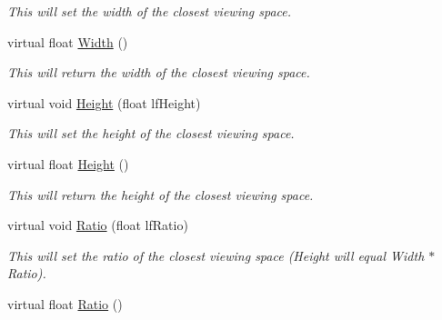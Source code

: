 \begin{DoxyCompactItemize}
\begin{DoxyCompactList}\small\item\em This will set the width of the closest viewing space. \end{DoxyCompactList}\item 
\hypertarget{classc_perspective_control_a9c22ac8a598cf9c6c732bb4fbb5bd333}{
virtual float \hyperlink{classc_perspective_control_a9c22ac8a598cf9c6c732bb4fbb5bd333}{Width} ()}
\label{classc_perspective_control_a9c22ac8a598cf9c6c732bb4fbb5bd333}

\begin{DoxyCompactList}\small\item\em This will return the width of the closest viewing space. \end{DoxyCompactList}\item 
\hypertarget{classc_perspective_control_a83d8c55d372776fad7c3f50e491fed0c}{
virtual void \hyperlink{classc_perspective_control_a83d8c55d372776fad7c3f50e491fed0c}{Height} (float lfHeight)}
\label{classc_perspective_control_a83d8c55d372776fad7c3f50e491fed0c}

\begin{DoxyCompactList}\small\item\em This will set the height of the closest viewing space. \end{DoxyCompactList}\item 
\hypertarget{classc_perspective_control_a86ce18eca9d81e0b3efa11585c582f64}{
virtual float \hyperlink{classc_perspective_control_a86ce18eca9d81e0b3efa11585c582f64}{Height} ()}
\label{classc_perspective_control_a86ce18eca9d81e0b3efa11585c582f64}

\begin{DoxyCompactList}\small\item\em This will return the height of the closest viewing space. \end{DoxyCompactList}\item 
\hypertarget{classc_perspective_control_ab6a66dcb1252a08b6bd5de5ab7ef54dc}{
virtual void \hyperlink{classc_perspective_control_ab6a66dcb1252a08b6bd5de5ab7ef54dc}{Ratio} (float lfRatio)}
\label{classc_perspective_control_ab6a66dcb1252a08b6bd5de5ab7ef54dc}

\begin{DoxyCompactList}\small\item\em This will set the ratio of the closest viewing space (Height will equal Width $\ast$ Ratio). \end{DoxyCompactList}\item 
\hypertarget{classc_perspective_control_a04c6bbe06bfc7830c5111317bdd14f2e}{
virtual float \hyperlink{classc_perspective_control_a04c6bbe06bfc7830c5111317bdd14f2e}{Ratio} ()}
\label{classc_perspective_control_a04c6bbe06bfc7830c5111317bdd14f2e}


\end{DoxyCompactItemize}
